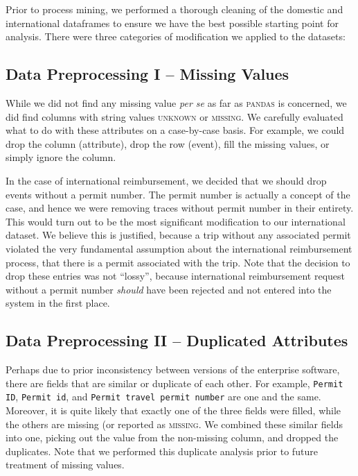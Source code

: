 \documentclass[conference]{IEEEtran}
\begin{document}

Prior to process mining, we performed a thorough cleaning of the
domestic and international dataframes to ensure we have
the best possible starting
point for analysis. There were three categories of modification we applied
to the datasets:

\subsection{Data Preprocessing I -- Missing Values}

While we did not find any missing value \textit{per se} as far
as \textsc{pandas} is concerned, we did find columns with string values
\textsc{unknown} or \textsc{missing}. We
carefully evaluated what to do with these attributes on a case-by-case
basis. For example, we could drop the column (attribute), drop the row
(event), fill the missing values, or simply ignore the column.

In the case of international reimbursement, we decided that we should
drop events without a permit number. The permit number is actually a
concept of the case, and hence we were removing traces without permit
number in their entirety. This would turn out to be the most significant
modification to our international dataset.
We believe this is justified, because a trip
without any associated permit violated the very fundamental assumption
about the international reimbursement process, that there is a permit
associated with the trip. Note that the decision to drop these entries was
not ``lossy'', because international reimbursement request without a permit
number \textit{should} have been rejected and not entered into the system
in the first place.

\subsection{Data Preprocessing II -- Duplicated Attributes}

Perhaps due to prior inconsistency between
versions of the enterprise software, there are fields that are similar
or duplicate of each other. For example, \texttt{Permit ID}, \texttt{Permit id},
and \texttt{Permit travel permit number} are one and the same.
Moreover, it is quite likely that exactly one of the three fields were
filled, while the others are missing (or reported as
\textsc{missing}. We combined these similar fields into one, picking out
the value from the non-missing column, and dropped the duplicates. Note that 
we performed this duplicate analysis prior to future treatment of missing
values.
\end{document}
